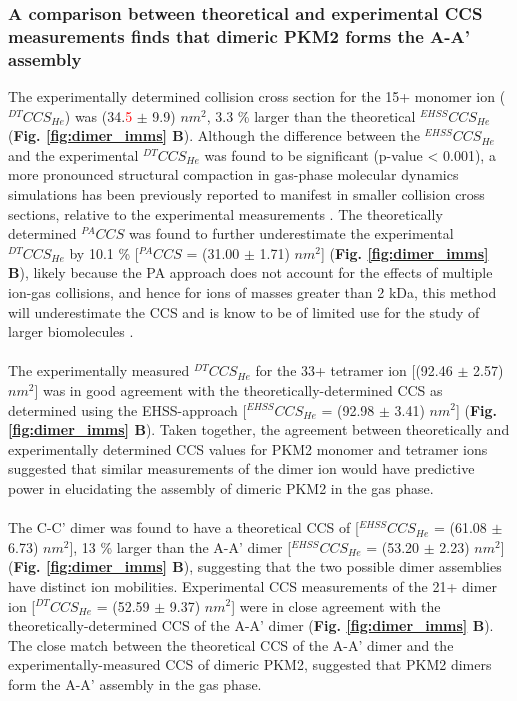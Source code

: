\subsubsection{A comparison between theoretical and experimental CCS measurements finds that dimeric PKM2 forms the A-A' assembly}
The experimentally determined collision cross section for the 15+ monomer ion ($^{DT}CCS_{He}$) was (34.\textcolor{red}{5} $\pm$ 9.9) $nm^2$, 3.3 \% larger than the theoretical $^{EHSS}CCS_{He}$ (\textbf{Fig. \ref{fig:dimer_imms} B}). Although the difference between the $^{EHSS}CCS_{He}$ and the experimental $^{DT}CCS_{He}$ was found to be significant (p-value < 0.001), a more pronounced structural compaction in gas-phase molecular dynamics simulations has been previously reported to manifest in smaller collision cross sections, relative to the experimental measurements \cite{Pacholarz:2017aa}. The theoretically determined $^{PA}CCS$ was found to further underestimate the experimental $^{DT}CCS_{He}$ by 10.1 \% [$^{PA}CCS$ = (31.00 $\pm$ 1.71) $nm^2$] (\textbf{Fig. \ref{fig:dimer_imms} B}), likely because the PA approach does not account for the effects of multiple ion-gas collisions, and hence for ions of masses greater than 2 kDa, this method will underestimate the CCS and is know to be of limited use for the study of larger biomolecules \cite{Jurneczko:2011aa}. 
%
%
\\\\
%
%
The experimentally measured $^{DT}CCS_{He}$ for the 33+ tetramer ion [(92.46 $\pm$ 2.57) $nm^2$] was in good agreement with the theoretically-determined CCS as determined using the EHSS-approach [$^{EHSS}CCS_{He}$ = (92.98 $\pm$ 3.41) $nm^2$] (\textbf{Fig. \ref{fig:dimer_imms} B}). Taken together, the agreement between theoretically and experimentally determined CCS values for PKM2 monomer and tetramer ions suggested that similar measurements of the dimer ion would have predictive power in elucidating the assembly of dimeric PKM2 in the gas phase.
%
%
\\\\
%
%
The C-C' dimer was found to have a theoretical CCS of [$^{EHSS}CCS_{He}$ = (61.08 $\pm$ 6.73) $nm^2$], 13 \% larger than the A-A' dimer [$^{EHSS}CCS_{He}$ = (53.20 $\pm$ 2.23) $nm^2$] (\textbf{Fig. \ref{fig:dimer_imms} B}), suggesting that the two possible dimer assemblies have distinct ion mobilities. Experimental CCS measurements of the 21+ dimer ion [$^{DT}CCS_{He}$ = (52.59 $\pm$ 9.37) $nm^2$] were in close agreement with the theoretically-determined CCS of the A-A' dimer (\textbf{Fig. \ref{fig:dimer_imms} B}). The close match between the theoretical CCS of the A-A' dimer and the experimentally-measured CCS of dimeric PKM2, suggested that PKM2 dimers form the A-A' assembly in the gas phase. 

